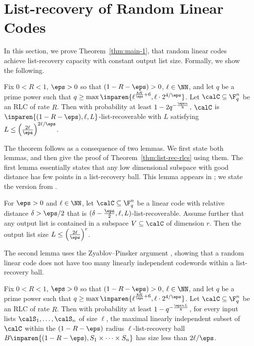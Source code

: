 \documentclass{article}
\begin{document}
\section{List-recovery of Random Linear Codes}\label{sec:list-rec-rlcs}
In this section, we prove Theorem~\ref{thm:main-1}, that random linear codes achieve list-recovery capacity with constant output list size. Formally, we show the following.
\begin{theorem}
    Fix $0 < R < 1$, $\eps>0$ so that $(1-R-\eps)>0$, $\ell \in \NN$, and let $q$ be a prime power such that $q \ge \max \inparen{\ell^{\frac{8R}{\eps}+6},\ell \cdot 2^{4/\eps}}$.
    Let $\calC \subseteq \F_q^n$ be an RLC of rate $R$.
    Then with probability at least $1-2q^{-\frac{\eps n}{8}}$, $\calC$ is $\inparen{(1-R-\eps), \ell, L}$-list-recoverable with $L$ satisfying $L \le \left(\frac{2\ell}{\eps}\right)^{2\ell/\eps}$.
    \label{thm:list-rec-rlcs}
\end{theorem}

The theorem follows as a consequence of two lemmas. We first state both lemmas, and then give the proof of Theorem~\ref{thm:list-rec-rlcs} using them. The first lemma essentially states that any low dimensional subspace with good distance has few points in a list-recovery ball. This lemma appears in \cite{kopparty2018improved,tamo2023tighter}; we state the version from \cite[Lemma 3.1]{tamo2023tighter}.

\begin{lemma}
For $\eps>0$ and $\ell \in \NN$, let $\calC \subseteq \F_q^n$ be a linear code with relative distance $\delta > \eps/2$ that is $(\delta - \frac{\eps}{2}, \ell, L)$-list-recoverable. Assume further that any output list is contained in a subspace $V \subseteq \calC$ of dimension $r$.
Then the output list size $L \le \left(\frac{2\ell}{\eps}\right)^r$.
    \label{lem:tamo23}
\end{lemma}

The second lemma uses the Zyablov--Pinsker argument \cite{zyablov1981list}, showing that a random linear code does not have too many linearly independent codewords within a list-recovery ball.

\begin{lemma}
    Fix $0 < R < 1$, $\eps>0$ so that $(1-R-\eps)>0$, $\ell \in \NN$, and let $q$ be a prime power such that $q \ge \max \inparen{\ell^{\frac{8R}{\eps}+6},\ell \cdot 2^{4/\eps}}$.
    Let $\calC \subseteq \F_q^n$ be an RLC of rate $R$.
    Then with probability at least $1-q^{-\frac{\eps nL}{8}}$, for every input lists $\calS_1, \ldots, \calS_n$ of size $\ell$, the maximal linearly independent subset of $\calC$ within the $(1-R-\eps)$ radius $\ell$-list-recovery ball $B\inparen{ (1-R-\eps), S_1 \times  \cdots \times S_n}$ has size less than $2\ell/\eps$.
    \label{lem:zp}
\end{lemma}
\end{document}
